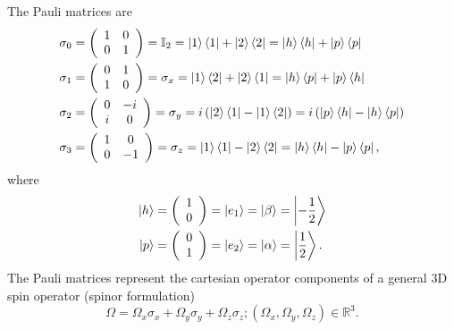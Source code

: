 \documentclass[aps,preprint]{revtex4}%
\begin{document}
The Pauli matrices are%
\begin{align}
\mathbb{\sigma}_{0}  &  =\left(
\begin{array}
[c]{cc}%
1 & 0\\
0 & 1
\end{array}
\right)  =\mathbb{I}_{2}=\left\vert 1\right\rangle \left\langle 1\right\vert
+\left\vert 2\right\rangle \left\langle 2\right\vert =\left\vert
h\right\rangle \left\langle h\right\vert +\left\vert p\right\rangle
\left\langle p\right\vert \\
\mathbb{\sigma}_{1}  &  =\left(
\begin{array}
[c]{cc}%
0 & 1\\
1 & 0
\end{array}
\right)  =\mathbb{\sigma}_{x}=\left\vert 1\right\rangle \left\langle
2\right\vert +\left\vert 2\right\rangle \left\langle 1\right\vert =\left\vert
h\right\rangle \left\langle p\right\vert +\left\vert p\right\rangle
\left\langle h\right\vert \\
\mathbb{\sigma}_{2}  &  =\left(
\begin{array}
[c]{cc}%
0 & -i\\
i & 0
\end{array}
\right)  =\mathbb{\sigma}_{y}=i\left(  \left\vert 2\right\rangle \left\langle
1\right\vert -\left\vert 1\right\rangle \left\langle 2\right\vert \right)
=i\left(  \left\vert p\right\rangle \left\langle h\right\vert -\left\vert
h\right\rangle \left\langle p\right\vert \right) \\
\mathbb{\sigma}_{3}  &  =\left(
\begin{array}
[c]{cc}%
1 & 0\\
0 & -1
\end{array}
\right)  =\mathbb{\sigma}_{z}=\left\vert 1\right\rangle \left\langle
1\right\vert -\left\vert 2\right\rangle \left\langle 2\right\vert =\left\vert
h\right\rangle \left\langle h\right\vert -\left\vert p\right\rangle
\left\langle p\right\vert ,
\end{align}
where
\begin{align}
\left\vert h\right\rangle  &  =\left(
\begin{array}
[c]{c}%
1\\
0
\end{array}
\right)  =\left\vert e_{1}\right\rangle =\left\vert \beta\right\rangle
=\left\vert -\frac{1}{2}\right\rangle \\
\left\vert p\right\rangle  &  =\left(
\begin{array}
[c]{c}%
0\\
1
\end{array}
\right)  =\left\vert e_{2}\right\rangle =\left\vert \alpha\right\rangle
=\left\vert \frac{1}{2}\right\rangle .
\end{align}
The Pauli matrices represent the cartesian operator components of a general 3D
spin operator (spinor formulation)
\begin{equation}
\Omega=\Omega_{x}\mathbb{\sigma}_{x}+\Omega_{y}\mathbb{\sigma}_{y}+\Omega
_{z}\mathbb{\sigma}_{z};\left(  \Omega_{x},\Omega_{y},\Omega_{z}\right)
\in\mathbb{R}^{3}.
\end{equation}
\end{document}
